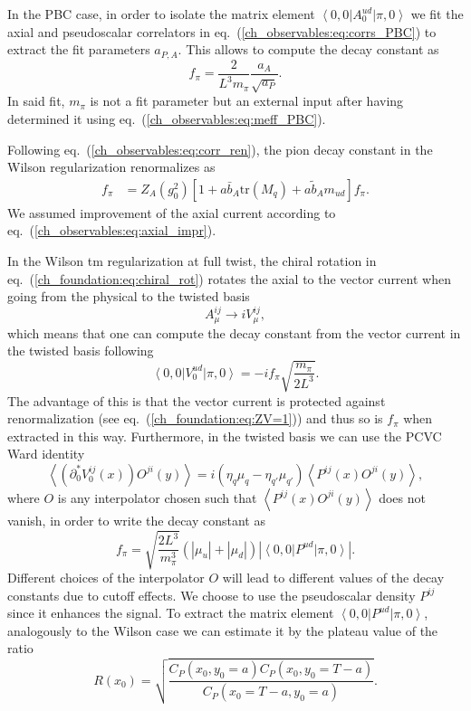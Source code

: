 In the PBC case, in order to isolate the matrix element $\left<0,0\right|A_0^{ud}\left|\pi,0\right>$ we fit the axial and pseudoscalar correlators in eq.~(\ref{ch_observables:eq:corrs_PBC}) to extract the fit parameters $a_{P,A}$. This allows to compute the decay constant as
\begin{equation}
f_{\pi}=\frac{2}{L^3m_{\pi}}\frac{a_A}{\sqrt{a_P}}.
\end{equation}
In said fit, $m_{\pi}$ is not a fit parameter but an external input after having determined it using eq.~(\ref{ch_observables:eq:meff_PBC}).

Following eq.~(\ref{ch_observables:eq:corr_ren}), the pion decay constant in the Wilson regularization renormalizes as
\begin{align}
f_{\pi}&=Z_A(g_0^2)\left[1+a\bar{b}_A{\textrm{tr}}\left(M_q\right)+a\tilde{b}_Am_{ud}\right]f_{\pi}.
\end{align}
We assumed improvement of the axial current according to eq.~(\ref{ch_observables:eq:axial_impr}).

In the Wilson tm regularization at full twist, the chiral rotation in eq.~(\ref{ch_foundation:eq:chiral_rot}) rotates the axial to the vector current when going from the physical to the twisted basis
\begin{equation}
A_{\mu}^{ij}\rightarrow iV_{\mu}^{ij},
\end{equation}
which means that one can compute the decay constant from the vector current in the twisted basis following
\begin{equation}
\label{ch_observables:eq:vector_matrix_element}
\left<0,0\right|V_0^{ud}\left|\pi,0\right>=-if_{\pi}\sqrt{\frac{m_{\pi}}{2L^3}}.
\end{equation}
The advantage of this is that the vector current is protected against renormalization (see eq.~(\ref{ch_foundation:eq:ZV=1})) and thus so is $f_{\pi}$ when extracted in this way. Furthermore, in the twisted basis we can use the PCVC Ward identity
\begin{equation}
\left<\left(\partial_0^*V_0^{ij}(x)\right)O^{ji}(y)\right>=i\left(\eta_q\mu_q-\eta_{q'}\mu_{q'}\right)\left<P^{ij}(x)O^{ji}(y)\right>,
\end{equation}
where $O$ is any interpolator chosen such that $\left<P^{ij}(x)O^{ji}(y)\right>$ does not vanish, in order to write the decay constant as
\begin{equation}
f_{\pi}=\sqrt{\frac{2L^3}{m_{\pi}^3}}\left(|\mu_u|+|\mu_{d}|\right)\left|\left<0,0\right|P^{ud}\left|\pi,0\right>\right|.
\end{equation}
Different choices of the interpolator $O$ will lead to different values of the decay constants due to cutoff effects. We choose to use the pseudoscalar density $P^{ij}$ since it enhances the signal. To extract the matrix element $\left<0,0\right|P^{ud}\left|\pi,0\right>$, analogously to the Wilson case we can estimate it by the plateau value of the ratio
\begin{equation}
R(x_0)=\sqrt{\frac{C_P(x_0,y_0=a)C_P(x_0,y_0=T-a)}{C_P(x_0=T-a,y_0=a)}}.
\end{equation}

